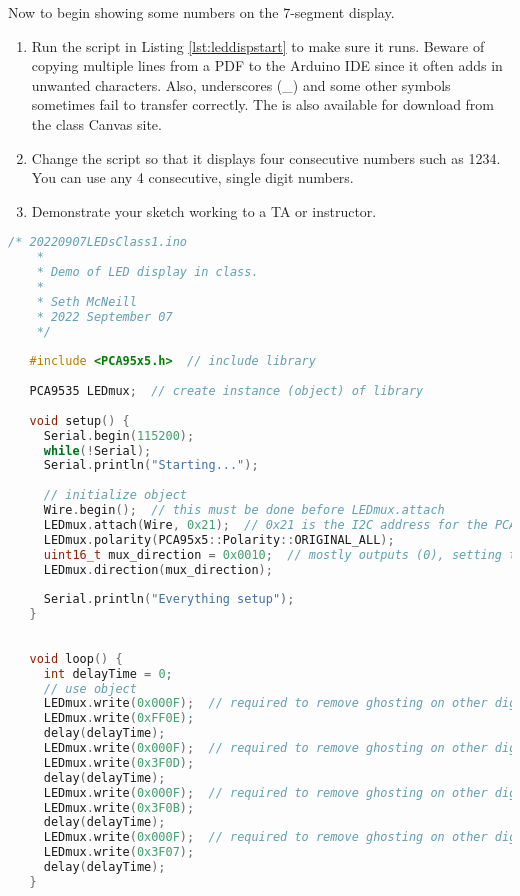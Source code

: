 Now to begin showing some numbers on the 7-segment display.

\begin{enumerate}
    \item Run the script in Listing \ref{lst:leddispstart} to make sure it runs. Beware of copying
            multiple lines from a PDF to the Arduino IDE since it often adds in unwanted characters. 
            Also, underscores (\_) and some other symbols sometimes fail to transfer correctly. The 
            is also available for download from the class Canvas site.
    \item Change the script so that it displays four consecutive numbers such as 1234. You can use
            any 4 consecutive, single digit numbers.
    \item Demonstrate your sketch working to a TA or instructor.
\end{enumerate}

\begin{lstlisting}[language=C++, caption={This listing is a starting point for driving the LED display. This sketch may also be available on Canvas.},label={lst:leddispstart}]
    /* 20220907LEDsClass1.ino
    *  
    * Demo of LED display in class.
    * 
    * Seth McNeill
    * 2022 September 07
    */
   
   #include <PCA95x5.h>  // include library
   
   PCA9535 LEDmux;  // create instance (object) of library
   
   void setup() {
     Serial.begin(115200);
     while(!Serial);
     Serial.println("Starting...");
   
     // initialize object
     Wire.begin();  // this must be done before LEDmux.attach
     LEDmux.attach(Wire, 0x21);  // 0x21 is the I2C address for the PCA9535 attached to the LEDs
     LEDmux.polarity(PCA95x5::Polarity::ORIGINAL_ALL);
     uint16_t mux_direction = 0x0010;  // mostly outputs (0), setting to 1 designates input
     LEDmux.direction(mux_direction);
   
     Serial.println("Everything setup");
   }
   
   
   void loop() {
     int delayTime = 0;
     // use object
     LEDmux.write(0x000F);  // required to remove ghosting on other digits
     LEDmux.write(0xFF0E);
     delay(delayTime); 
     LEDmux.write(0x000F);  // required to remove ghosting on other digits
     LEDmux.write(0x3F0D);
     delay(delayTime); 
     LEDmux.write(0x000F);  // required to remove ghosting on other digits
     LEDmux.write(0x3F0B);
     delay(delayTime); 
     LEDmux.write(0x000F);  // required to remove ghosting on other digits
     LEDmux.write(0x3F07);
     delay(delayTime); 
   }
\end{lstlisting}
    
